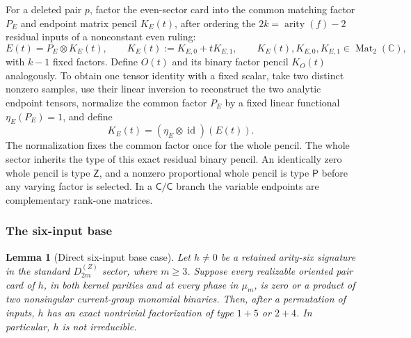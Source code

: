 \documentclass[11pt,letterpaper,onecolumn]{article}
\theoremstyle{plain}
\newtheorem{lemma}[lemma]{Lemma}
\theoremstyle{definition}
\theoremstyle{remark}
\newcommand{\DihZ}[1]{{D_{#1}^{(Z)}}}
\newcommand{\Mat}{\operatorname{Mat}}
\newcommand{\arity}{\operatorname{arity}}
\begin{document}
For a deleted pair \(p\), factor the even-sector card into the common matching
factor \(P_E\) and endpoint matrix pencil \(K_E(t)\), after ordering the
\(2k=\arity(f)-2\) residual inputs of a nonconstant even ruling:
\begin{equation*}
  E(t)=P_E\otimes K_E(t),
  \qquad
  K_E(t):=K_{E,0}+tK_{E,1},
  \qquad K_E(t),K_{E,0},K_{E,1}\in\Mat_2(\mathbb C),
\end{equation*}
with \(k-1\) fixed factors. Define \(O(t)\) and its binary factor pencil
\(K_O(t)\) analogously.  To obtain one tensor identity with a fixed scalar, take
two distinct nonzero samples, use their linear inversion to reconstruct the
two analytic endpoint tensors, normalize the common factor \(P_E\) by a
fixed linear functional \(\eta_E(P_E)=1\), and define
\[
 K_E(t)=(\eta_E\otimes\operatorname{id})(E(t)).
\]
The normalization fixes the common factor once for the whole pencil.
The whole sector inherits the type of this exact residual binary pencil.
An identically zero whole pencil is type \(\mathsf{Z}\), and a nonzero proportional
whole pencil is type \(\mathsf{P}\) before any varying factor is selected.  In a
\(\mathsf{C}/\mathsf{C}\) branch the variable endpoints are complementary rank-one matrices.

\subsubsection{The six-input base}

\begin{lemma}[Direct six-input base case]
\label{lem:nd-six-prime-base}
Let \(h\ne0\) be a retained arity-six signature in the standard
\(\DihZ{2m}\) sector, where \(m\ge3\).  Suppose every realizable oriented
pair card of \(h\), in both kernel parities and at every phase in
\(\mu_m\), is zero or a product of two nonsingular current-group
monomial binaries.  Then, after a permutation of inputs, \(h\) has an exact
nontrivial factorization of type \(1+5\) or \(2+4\).  In particular,
\(h\) is not irreducible.
\end{lemma}
\end{document}
